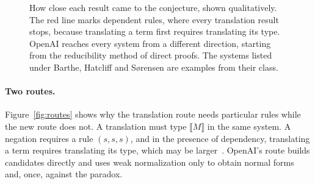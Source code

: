 \documentclass[10pt]{article}
\begin{document}
\begin{figure}[H]
\caption{How close each result came to the conjecture, shown qualitatively. The red
line marks dependent rules, where every translation result stops, because
translating a term first requires translating its type. OpenAI reaches every system
from a different direction, starting from the reducibility method of direct proofs.
The systems listed under Barthe, Hatcliff and Sørensen are examples from their
class.}
\label{fig:distance}
\end{figure}

\paragraph{Two routes.} Figure~\ref{fig:routes} shows why the translation route
needs particular rules while the new route does not. A translation must type
$\llbracket M\rrbracket$ in the same system. A negation requires a rule $(s,s,s)$,
and in the presence of dependency, translating a term requires translating its type,
which may be larger~\cite[\S3.6]{Sorensen1997}. OpenAI's route builds candidates
directly and uses weak normalization only to obtain normal forms and, once, against
the paradox.
\end{document}
